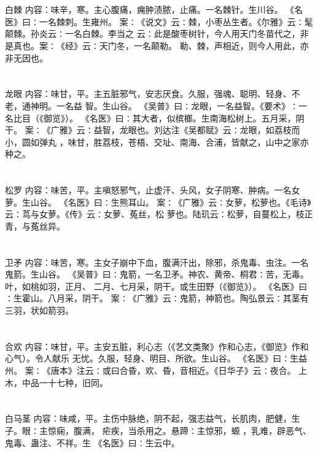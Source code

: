 \documentclass[12pt,UTF8]{ctexbook}
\begin{document}
\section{}白棘
内容：味辛，寒。主心腹痛，痈肿渍脓，止痛。一名棘针。生川谷。 
《名医》曰∶一名棘刺。生雍州。 
案∶《说文》云∶棘，小枣丛生者。《尔雅》云∶髦颠棘。孙炎云∶一名白棘。李当之 
云∶此是酸枣树针，今人用天门冬苗代之，非是真也。案∶《经》云∶天门冬，一名颠勒。 
勒、棘，声相近，则今人用此，亦非无因也。 


\section{}龙眼
内容：味甘，平。主五脏邪气，安志厌食。久服，强魂、聪明、轻身、不老，通神明。一名益 
智。生山谷。 
《吴普》曰∶龙眼，一名益智。《要术》∶一名比目（《御览》）。 
《名医》曰∶其大者，似槟榔。生南海松树上。五月采，阴干。 
案∶《广雅》云∶益智，龙眼也。刘达注《吴都赋》云∶龙眼，如荔枝而小，圆如弹丸 
，味甘，胜荔枝，苍梧、交址、南海、合浦，皆献之，山中之家亦种之。 


\section{}松罗
内容：味苦，平。主嗔怒邪气，止虚汗、头风，女子阴寒、肿病。一名女萝。生山谷。 
《名医》曰∶生熊耳山。 
案∶《广雅》云∶女萝，松萝也。《毛诗》云∶茑与女萝。《传》云∶女萝、菟丝，松 
萝也。陆玑云∶松萝，自蔓松上，枝正青，与菟丝异。 


\section{}卫矛
内容：味苦，寒。主女子崩中下血，腹满汗出，除邪，杀鬼毒、虫注。一名鬼箭。生山谷。 
《吴普》曰∶鬼箭，一名卫矛。神农、黄帝、桐君∶苦，无毒。叶，如桃如羽，正月、 
二月、七月采，阴干。或生田野（《御览》）。 
《名医》曰∶生霍山。八月采，阴干。 
案∶《广雅》云∶鬼箭，神箭也。陶弘景云∶其茎有三羽，状如箭羽。 


\section{}合欢
内容：味甘，平。主安五脏，利心志（《艺文类聚》作和心志，《御览》作和心气）。令人献乐 
无忧。久服，轻身、明目、所欲。生山谷。 
《名医》曰∶生益州。 
案∶《唐本》注云∶或曰合昏，欢、昏，音相近。《日华子》云∶夜合。 
上木，中品一十七种，旧同。 


\section{}白马茎
内容：味咸，平。主伤中脉绝，阴不起，强志益气，长肌肉，肥健，生子。眼∶主惊痫，腹满， 
疟疾，当杀用之。悬蹄∶主惊邪，螈 ，乳难，辟恶气、鬼毒、蛊注、不祥。生 
《名医》曰∶生云中。 
\end{document}
